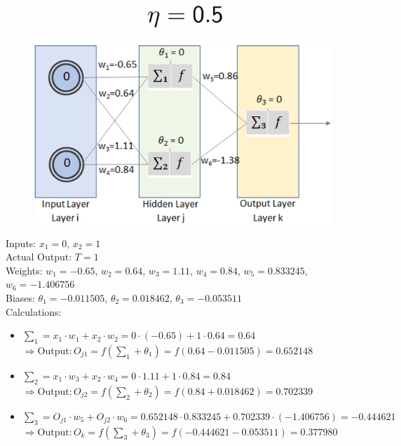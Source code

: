 \documentclass{book}
\begin{document}
\begin{figure}
    \includegraphics[scale=0.15]{chapter 7/ch7_figure9.jpeg}
\end{figure}
Inputs: \(x_1 = 0\), \(x_2 = 1\)\\
Actual Output: \(T = 1\)\\
Weights: \(w_1 = -0.65\), \(w_2 = 0.64\), \(w_3 = 1.11\), \(w_4 = 0.84\), \(w_5 = 0.833245\), \(w_6 = -1.406756\)\\
Biases: \(\theta_1 = -0.011505\), \(\theta_2 = 0.018462\), \(\theta_3 = -0.053511\)\\
Calculations:\\
\begin{itemize}
    \item \(\sum_1 = x_1 \cdot w_1 + x_2 \cdot w_2 = 0 \cdot (-0.65) + 1 \cdot 0.64 = 0.64\)\\
    \(\Rightarrow \text{Output}: O_{j1} = f(\sum_1 + \theta_1) = f(0.64 - 0.011505) = 0.652148\)
    \item \(\sum_2 = x_1 \cdot w_3 + x_2 \cdot w_4 = 0 \cdot 1.11 + 1 \cdot 0.84 = 0.84\)\\
    \(\Rightarrow \text{Output}: O_{j2} = f(\sum_2 + \theta_2) = f(0.84 + 0.018462) = 0.702339\)
    \item \(\sum_3 = O_{j1} \cdot w_5 + O_{j2} \cdot w_6 = 0.652148 \cdot 0.833245 + 0.702339 \cdot (-1.406756) = -0.444621\)\\
    \(\Rightarrow \text{Output}: O_{k} = f(\sum_3 + \theta_3) = f(-0.444621 - 0.053511) = 0.377980\)\\
\end{itemize}
\\
\end{document}
